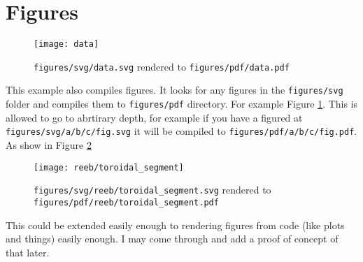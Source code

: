 \section{Figures}

\begin{figure}[h]
  \centering
  \texttt{[image: data]}
  \caption{\texttt{figures/svg/data.svg} rendered to \texttt{figures/pdf/data.pdf}}
\label{fig:data}
\end{figure}
This example also compiles figures. It looks for any figures in the \texttt{figures/svg} folder and compiles them to \texttt{figures/pdf} directory. For example Figure \ref{fig:data}. This is allowed to go to abrtirary depth, for example if you have a figured at \texttt{figures/svg/a/b/c/fig.svg} it will be compiled to \texttt{figures/pdf/a/b/c/fig.pdf}. As show in Figure \ref{fig:reeb}
\begin{figure}
  \centering
  \texttt{[image: reeb/toroidal\_segment]}
  \caption{\texttt{figures/svg/reeb/toroidal\_segment.svg} rendered to \texttt{figures/pdf/reeb/toroidal\_segment.pdf}}
\label{fig:reeb}
\end{figure}
This could be extended easily enough to rendering figures from code (like plots and things) easily enough. I may come through and add a proof of concept of that later. 
